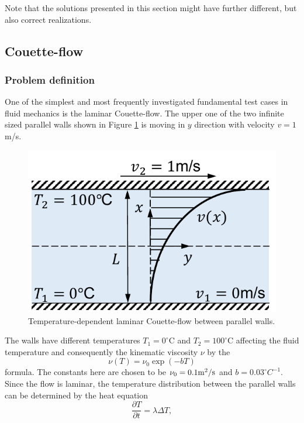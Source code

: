 \documentclass[a4paper,12pt,openany]{book}
\theoremstyle{break}
\begin{document}
Note that the solutions presented in this section might have further different, but also correct realizations.
\subsection{Couette-flow}
\subsubsection{Problem definition}
One of the simplest and most frequently investigated fundamental test cases in fluid mechanics is the laminar Couette-flow. The upper one of the two infinite sized parallel walls shown in Figure \ref{fig:couette} is moving in $y$ direction with velocity $v=1$m/s.
\begin{figure}[H]
  \includegraphics[scale=0.7]{couette.pdf}
  \centering
  \caption{Temperature-dependent laminar Couette-flow between parallel walls.}
  \label{fig:couette}
\end{figure}\vspace*{3pt}
The walls have different temperatures $T_1=0^\circ$C and $T_2=100^\circ$C affecting the fluid temperature and consequently the kinematic viscosity $\nu$ by the
\begin{equation}
\nu(T)=\nu_0 \exp(-bT)
\end{equation}
formula. The constants here are chosen to be $\nu_0=0.1\rm{m}^2/\rm s$ and $b=0.03 ^\circ C^{-1}$. Since the flow is laminar, the temperature distribution between the parallel walls can be determined by the heat equation
\begin{equation} \label{eq:couette_laplace}
\frac{\partial T}{\partial t}=\lambda\Delta T,
\end{equation}
\end{document}
